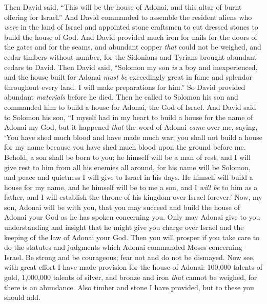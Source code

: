 \begin{biblechapter} %
\verse Then David said, “This will be the house of Adonai, and this altar of burnt offering for Israel.”
 And David commanded to assemble the resident aliens who \textit{were} in the land of Israel and appointed stone craftsmen to cut dressed stones to build the house of God.
\verse And David provided much iron for nails for the doors of the gates and for the seams, and abundant copper \textit{that} could not be weighed,
\verse and cedar timbers without number, for the Sidonians and Tyrians brought abundant cedars to David.
\verse Then David said, “Solomon my son \textit{is} a boy and inexperienced, and the house built for Adonai \textit{must be} exceedingly great in fame and splendor throughout every land. I will make preparations for him.” So David provided abundant \textit{materials} before he died.
 Then he called to Solomon his son and commanded him to build a house for Adonai, the God of Israel.
\verse And David said to Solomon his son, “I myself had in my heart to build a house for the name of Adonai my God,
\verse but it happened \textit{that} the word of Adonai \textit{came} over me, saying, ‘You have shed much blood and have made much war; you shall not build a house for my name because you have shed much blood upon the ground before me.
\verse Behold, a son shall be born to you; he himself will be a man of rest, and I will give rest to him from all his enemies all around, for his name will be Solomon, and peace and quietness I will give to Israel in his days.
\verse He himself will build a house for my name, and he himself will be to me a son, and I \textit{will be} to him as a father, and I will establish the throne of his kingdom over Israel forever.’
\verse Now, my son, Adonai will be with you, that you may succeed and build the house of Adonai your God as he has spoken concerning you.
\verse Only may Adonai give to you understanding and insight that he might give you charge over Israel and the keeping of the law of Adonai your God.
\verse Then you will prosper if you take care to do the statutes and judgments which Adonai commanded Moses concerning Israel. Be strong and be courageous; fear not and do not be dismayed.
\verse Now see, with great effort I have made provision for the house of Adonai: 100,000 talents of gold, 1,000,000 talents of silver, and bronze and iron \textit{that} cannot be weighed, for there is an abundance. Also timber and stone I have provided, but to these you should add.

\end{biblechapter}
